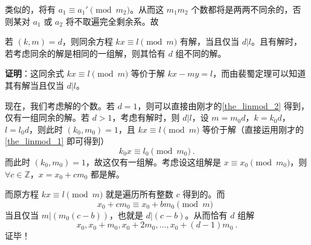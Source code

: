 类似的，将有 $a_1 \equiv a_1' \pmod{m_2}$。从而这 $m_1m_2$ 个数都将是两两不同余的，否则某对 $a_1$ 或 $a_2$ 将不取遍完全剩余系。故


\begin{theorem}{}
若 $(k, m) = d$，则同余方程 $kx \equiv l \pmod m$ 有解，当且仅当 $d | l$。且有解时，若考虑同余的解是相同的一组解，则其恰有 $d$ 组不同的解。
\end{theorem}
\textbf{证明}：这同余式 $kx \equiv l \pmod m$ 等价于解 $kx - my = l$，而由裴蜀定理可以知道其有解当且仅当 $d | l$。

现在，我们考虑解的个数。若 $d=1$，则可以直接由刚才的\autoref{the_linmod_2} 得到，仅有一组同余的解。若 $d > 1$，考虑有解时，则 $d|l$，设 $m = m_0 d$，$k = k_0 d$，$l = l_0 d$，则此时 $(k_0, m_0) = 1$，且 $kx \equiv l \pmod m$ 等价于解（直接运用刚才的\autoref{the_linmod_1} 即可得到）
\begin{equation}
k_0 x \equiv l_0 \pmod {m_0} ~.
\end{equation}
而此时 $(k_0, m_0) = 1$，故这仅有一组解。考虑设这组解是 $x \equiv x_0 \pmod {m_0}$，则 $\forall c \in \mathbb Z$，$x = x_0 + c m_0$ 都是解。

而原方程 $kx \equiv l \pmod m$ 就是遍历所有整数 $c$ 得到的。而
\begin{equation}
x_0 + c m_0 \equiv x_0 + b m_0 \pmod m ~~
\end{equation}
当且仅当 $m | (m_0 (c - b))$，也就是 $d | (c - b)$。从而恰有 $d$ 组解
\begin{equation}
x_0, x_0 + m_0, x_0 + 2 m_0, \dots, x_0 + (d-1) m_0 ~.
\end{equation}
证毕！